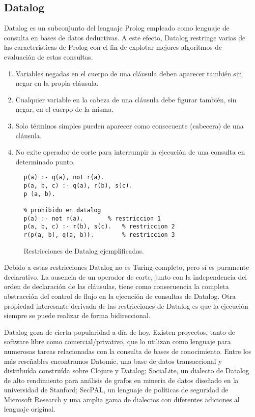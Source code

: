 \documentclass[11pt,captions=nooneline,DIV=14, parskip=full]{scrartcl}
\begin{document}
\subsection{Datalog}
Datalog es un subconjunto del lenguaje Prolog empleado como lenguaje de consulta en bases de datos deductivas. A este efecto, Datalog restringe varias de las características de Prolog con el fin de explotar mejores algoritmos de evaluación de estas consultas.

\begin{enumerate}
\item Variables negadas en el cuerpo de una cláusula deben aparecer también sin negar en la propia cláusula.
\item Cualquier variable en la cabeza de una cláusula debe figurar también, sin negar, en el cuerpo de la misma.
\item Solo términos simples pueden aparecer como consecuente (cabecera) de una cláusula.
\item No exite operador de corte para interrumpir la ejecución de una consulta en determinado punto.
\end{enumerate}

\begin{figure}[!htbp]
\lstset{language=Prolog}
\begin{lstlisting}[frame=single]
% permitido en datalog
p(a) :- q(a), not r(a).
p(a, b, c) :- q(a), r(b), s(c).
p (a, b).

% prohibido en datalog
p(a) :- not r(a).		% restriccion 1
p(a, b, c) :- r(b), s(c).	% restriccion 2
r(p(a, b), q(a, b)).		% restriccion 3

\end{lstlisting} 
\caption{Restricciones de Datalog ejemplificadas.}
\label{fig:restriccionesdatalog}
\end{figure}

Debido a estas restricciones Datalog no es Turing-completo, pero sí es puramente declarativo. La ausencia de un operador de corte, junto con la independencia del orden de declaración de las cláusulas, tiene como consecuencia la completa abstracción del control de flujo en la ejecución de consultas de Datalog. Otra propiedad interesante derivada de las restricciones de Datalog es que la ejecución siempre se puede realizar de forma bidireccional.

Datalog goza de cierta popularidad a día de hoy. Existen proyectos, tanto de software libre como comercial/privativo, que lo utilizan como lenguaje para numerosas tareas relacionadas con la consulta de bases de conocimiento. Entre los más reseñables encontramos Datomic, una base de datos transaccional y distribuída construída sobre Clojure y Datalog; SociaLite, un dialecto de Datalog de alto rendimiento para análisis de grafos en minería de datos diseñado en la universidad de Stanford; SecPAL, un lenguaje de políticas de seguridad de Microsoft Research y una amplia gama de dialectos con diferentes adiciones al lenguaje original.
\end{document}
